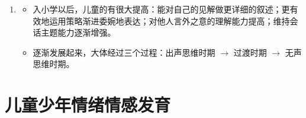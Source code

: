 \begin{keybox}
\begin{enumerate}[leftmargin=*]
    \item {}
    \begin{itemize}[leftmargin=*]
        \item 入小学以后，儿童的有很大提高：能对自己的见解做更详细的叙述；更有效地运用策略渐进委婉地表达；对他人言外之意的理解能力提高；维持会话主题能力逐渐增强。
        \item {}逐渐发展起来，大体经过三个过程：出声思维时期 $\to$ 过渡时期 $\to$ 无声思维时期。
    \end{itemize}
\end{enumerate}
\end{keybox}

\section{儿童少年情绪情感发育}

